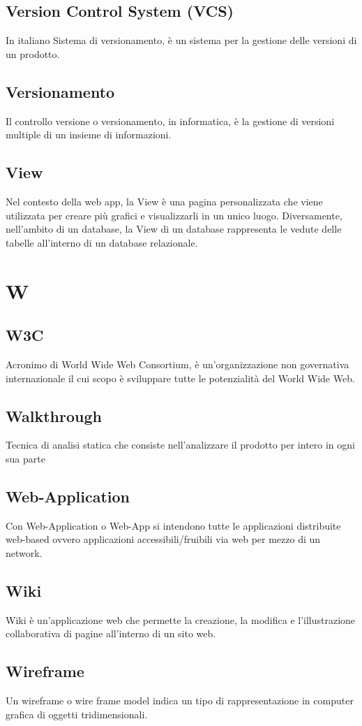\subsection{Version Control System (VCS)}  In italiano Sistema di versionamento, è un sistema per la gestione delle versioni di un prodotto.
\subsection{Versionamento}  Il controllo versione o versionamento, in informatica, è la gestione di versioni multiple di un insieme di informazioni. 
\subsection{View}  Nel contesto della web app, la View è una pagina personalizzata che viene utilizzata per creare più grafici e visualizzarli in un unico luogo. Diversamente, nell'ambito di un database, la View di un database rappresenta le vedute delle tabelle all'interno di un database relazionale.

\newpage \section{W}
\subsection{W3C}  Acronimo di World Wide Web Consortium, è un'organizzazione non governativa internazionale il cui scopo è sviluppare tutte le potenzialità del World Wide Web.
\subsection{Walkthrough}  Tecnica di analisi statica che consiste nell'analizzare il prodotto per intero in ogni sua parte
\subsection{Web-Application}  Con Web-Application o Web-App si intendono tutte le applicazioni distribuite web-based ovvero applicazioni accessibili/fruibili via web per mezzo di un network. 
\subsection{Wiki}  Wiki è un'applicazione web che permette la creazione, la modifica e l'illustrazione collaborativa di pagine all'interno di un sito web.
\subsection{Wireframe}  Un wireframe o wire frame model indica un tipo di rappresentazione in computer grafica di oggetti tridimensionali.
